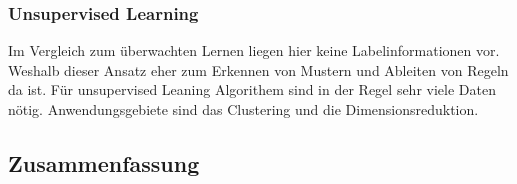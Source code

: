 \subsubsection{Unsupervised Learning}
Im Vergleich zum überwachten Lernen liegen hier keine Labelinformationen vor. Weshalb dieser Ansatz eher zum Erkennen von Mustern und Ableiten von Regeln da ist. Für unsupervised Leaning Algorithem sind in der Regel sehr viele Daten nötig. Anwendungsgebiete sind das Clustering und die Dimensionsreduktion.


\subsection{Zusammenfassung}